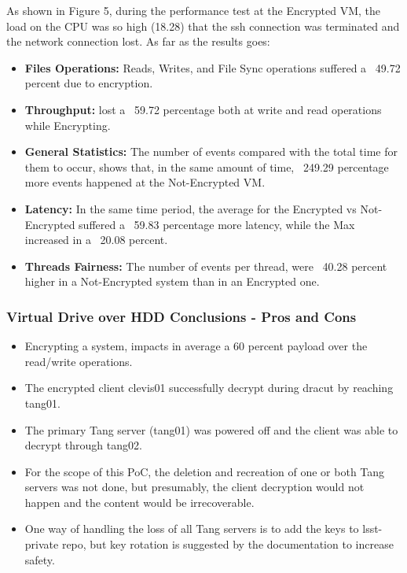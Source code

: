 As shown in Figure 5, during the performance test at the Encrypted VM, the load on the CPU was so high (18.28) that the ssh connection was terminated and the network connection lost. As far as the results goes:
\begin{itemize}
  \item \textbf{Files Operations:} Reads, Writes, and File Sync operations suffered a ~49.72 percent due to encryption.
  \item \textbf{Throughput:} lost a ~59.72 percentage both at write and read operations while Encrypting.
  \item \textbf{General Statistics:} The number of events compared with the total time for them to occur, shows that, in the same amount of time, ~249.29 percentage more events happened at the Not-Encrypted VM.
  \item \textbf{Latency:} In the same time period, the average for the Encrypted vs Not-Encrypted suffered a ~59.83 percentage more latency, while the Max increased in a ~20.08 percent.
  \item \textbf{Threads Fairness:} The number of events per thread, were ~40.28 percent higher in a Not-Encrypted system than in an Encrypted one.
\end{itemize}

\newpage
\subsubsection{Virtual Drive over HDD Conclusions - Pros and Cons}
\begin{itemize}
  \item Encrypting a system, impacts in average a 60 percent payload over the read/write operations.
  \item The encrypted client clevis01 successfully decrypt during dracut by reaching tang01.
  \item The primary Tang server (tang01) was powered off and the client was able to decrypt through tang02.
  \item For the scope of this PoC, the deletion and recreation of one or both Tang servers was not done, but presumably, the client decryption would not happen and the content would be irrecoverable.
  \item One way of handling the loss of all Tang servers is to add the keys to lsst-private repo, but key rotation is suggested by the documentation to increase safety.
\end{itemize}

\newpage
